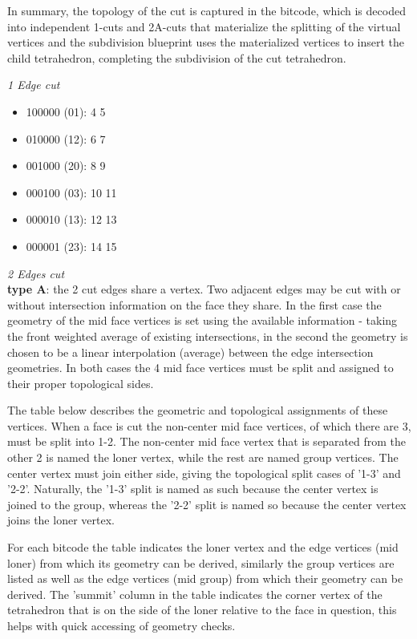 In summary, the topology of the cut is captured in the bitcode, which is decoded into independent 1-cuts and 2A-cuts that materialize the splitting of the virtual vertices and the subdivision blueprint uses the materialized vertices to insert the child tetrahedron, completing the subdivision of the cut tetrahedron.


\textit{1 Edge cut}
\begin{itemize}
    \item 100000 (01): 4 5
    \item 010000 (12): 6 7
    \item 001000 (20): 8 9
    \item 000100 (03): 10 11
    \item 000010 (13): 12 13
    \item 000001 (23): 14 15
\end{itemize}

\textit{2 Edges cut}\\
\textbf{type A}: the 2 cut edges share a vertex. Two adjacent edges may be cut with or without intersection information on the face they share. In the first case the geometry of the mid face vertices is set using the available information - taking the front weighted average of existing intersections, in the second the geometry is chosen to be a linear interpolation (average) between the edge intersection geometries. In both cases the 4 mid face vertices must be split and assigned to their proper topological sides.

The table below describes the geometric and topological assignments of these vertices. When a face is cut the non-center mid face vertices, of which there are 3, must be split into 1-2. The non-center mid face vertex that is separated from the other 2 is named the loner vertex, while the rest are named group vertices. The center vertex must join either side, giving the topological split cases of '1-3' and '2-2'. Naturally, the '1-3' split is named as such because the center vertex is joined to the group, whereas the '2-2' split is named so because the center vertex joins the loner vertex.

For each bitcode the table indicates the loner vertex and the edge vertices (mid loner) from which its geometry can be derived, similarly the group vertices are listed as well as the edge vertices (mid group) from which their geometry can be derived. The 'summit' column in the table indicates the corner vertex of the tetrahedron that is on the side of the loner relative to the face in question, this helps with quick accessing of geometry checks.

